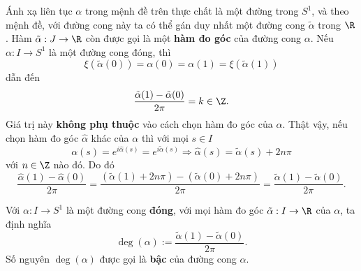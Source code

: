 	\begin{remark}
		Ánh xạ liên tục $\alpha$ trong mệnh đề trên thực chất là một đường trong $S^1$, và theo mệnh đề, với đường cong này ta có thể gán duy nhất một đường cong $\tilde{\alpha}$ trong $\R$. 
		Hàm $\tilde{\alpha}: J \to \R$ còn được gọi là một \textbf{hàm đo góc} của đường cong $\alpha$.
		Nếu $\alpha:I\to S^1$ là một đường cong đóng, %
		thì %
		\[\xi(\tilde{\alpha}(0))=\alpha(0)=\alpha(1)=\xi(\tilde{\alpha}(1))\] dẫn đến  
		\[\frac{\tilde{\alpha}(1) - \tilde{\alpha}(0)}{2\pi} =k\in \Z.\] 
		Giá trị này \textbf{không phụ thuộc} vào cách chọn hàm đo góc của $\alpha$. Thật vậy, nếu chọn hàm đo góc $\widehat{\alpha}$ khác của $\alpha$ thì với mọi $s\in I$
		\[
		\alpha(s) = e^{i \widehat{\alpha}(s)}= e^{i \widetilde{\alpha}(s)}\Longrightarrow \widehat{\alpha}(s)=\widetilde{\alpha}(s)+2n\pi
		\]
		với $n\in \Z$ nào đó. Do đó
		\[\frac{\widehat{\alpha}(1) - \widehat{\alpha}(0)}{2\pi}= \frac{(\tilde{\alpha}(1)+2n\pi) - (\tilde{\alpha}(0)+2n\pi)}{2\pi}=\frac{\tilde{\alpha}(1) - \tilde{\alpha}(0)}{2\pi}.\]
	\end{remark}
	

	\begin{definition}
		Với $\alpha: I \to S^1$ là một đường cong \textbf{đóng}, với mọi hàm đo góc $\tilde{\alpha}: I \to \R$ của $\alpha$,
		ta định nghĩa
		\[
		\deg(\alpha) := \frac{\tilde{\alpha}(1) - \tilde{\alpha}(0)}{2\pi}.
		\]
		Số nguyên $\deg(\alpha)$ được gọi là \textbf{bậc} của đường cong $\alpha$.
	\end{definition}
	
	
